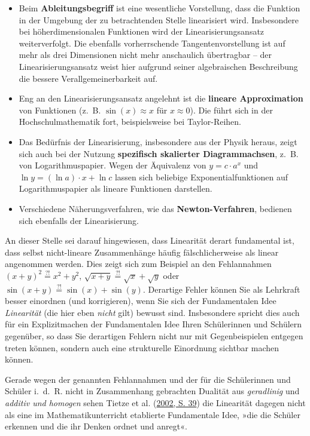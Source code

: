 \documentclass[
]{scrbook}
\providecommand{\tightlist}{%
  \setlength{\itemsep}{0pt}\setlength{\parskip}{0pt}}
\theoremstyle{definition}
\theoremstyle{definition}
\theoremstyle{definition}
\theoremstyle{definition}
\theoremstyle{remark}
\begin{document}
\begin{itemize}
\tightlist
\item
  Beim \textbf{Ableitungsbegriff} ist eine wesentliche Vorstellung, dass die Funktion in der Umgebung der zu betrachtenden Stelle linearisiert wird. Insbesondere bei höherdimensionalen Funktionen wird der Linearisierungsansatz weiterverfolgt. Die ebenfalls vorherrschende Tangentenvorstellung ist auf mehr als drei Dimensionen nicht mehr anschaulich übertragbar -- der Linearisierungsansatz weist hier aufgrund seiner algebraischen Beschreibung die bessere Verallgemeinerbarkeit auf.
\item
  Eng an den Linearisierungsansatz angelehnt ist die \textbf{lineare Approximation} von Funktionen (z.~B. \(\sin(x)\approx x\) für \(x\approx 0\)). Die führt sich in der Hochschulmathematik fort, beispielsweise bei Taylor-Reihen.
\item
  Das Bedürfnis der Linearisierung, insbesondere aus der Physik heraus, zeigt sich auch bei der Nutzung \textbf{spezifisch skalierter Diagrammachsen}, z.~B. von Logarithmuspapier. Wegen der Äquivalenz von \(y = c\cdot a^x\) und \(\ln y = (\ln a )\cdot x + \ln c\) lassen sich beliebige Exponentialfunktionen auf Logarithmuspapier als lineare Funktionen darstellen.
\item
  Verschiedene Näherungsverfahren, wie das \textbf{Newton-Verfahren}, bedienen sich ebenfalls der Linearisierung.
\end{itemize}

An dieser Stelle sei darauf hingewiesen, dass Linearität derart fundamental ist, dass selbst nicht-lineare Zusammenhänge häufig fälschlicherweise als linear angenommen werden. Dies zeigt sich zum Beispiel an den Fehlannahmen \((x+y)^2 \overset{?!}{=} x^2+y^2\), \(\sqrt{x+y} \overset{?!}{=} \sqrt{x}+\sqrt{y}\) oder \(\sin(x+y) \overset{?!}{=} \sin(x)+\sin(y)\). Derartige Fehler können Sie als Lehrkraft besser einordnen (und korrigieren), wenn Sie sich der Fundamentalen Idee \emph{Linearität} (die hier eben \emph{nicht} gilt) bewusst sind. Insbesondere spricht dies auch für ein Explizitmachen der Fundamentalen Idee Ihren Schülerinnen und Schülern gegenüber, so dass Sie derartigen Fehlern nicht nur mit Gegenbeispielen entgegen treten können, sondern auch eine strukturelle Einordnung sichtbar machen können.

Gerade wegen der genannten Fehlannahmen und der für die Schülerinnen und Schüler i.~d.~R. nicht in Zusammenhang gebrachten Dualität aus \emph{geradlinig} und \emph{additiv und homogen} sehen Tietze et al. (\protect\hyperlink{ref-Tietze:2002}{2002, S. 39}) die Linearität dagegen nicht als eine im Mathematikunterricht etablierte Fundamentale Idee, »die die Schüler erkennen und die ihr Denken ordnet und anregt«.
\end{document}
